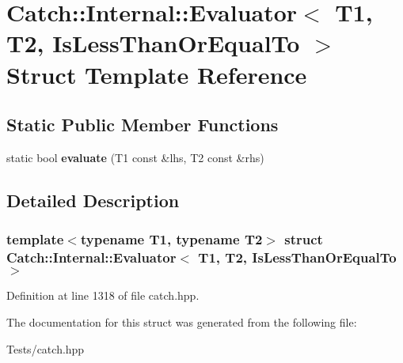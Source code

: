 \hypertarget{struct_catch_1_1_internal_1_1_evaluator_3_01_t1_00_01_t2_00_01_is_less_than_or_equal_to_01_4}{}\section{Catch\+:\+:Internal\+:\+:Evaluator$<$ T1, T2, Is\+Less\+Than\+Or\+Equal\+To $>$ Struct Template Reference}
\label{struct_catch_1_1_internal_1_1_evaluator_3_01_t1_00_01_t2_00_01_is_less_than_or_equal_to_01_4}
\subsection*{Static Public Member Functions}
\begin{DoxyCompactItemize}
\item 
\mbox{\label{struct_catch_1_1_internal_1_1_evaluator_3_01_t1_00_01_t2_00_01_is_less_than_or_equal_to_01_4_adf269a597e4d82d69f29bcb516297b9b}} 
static bool {\bfseries evaluate} (T1 const \&lhs, T2 const \&rhs)
\end{DoxyCompactItemize}


\subsection{Detailed Description}
\subsubsection*{template$<$typename T1, typename T2$>$\newline
struct Catch\+::\+Internal\+::\+Evaluator$<$ T1, T2, Is\+Less\+Than\+Or\+Equal\+To $>$}



Definition at line 1318 of file catch.\+hpp.



The documentation for this struct was generated from the following file\+:\begin{DoxyCompactItemize}
\item 
Tests/catch.\+hpp\end{DoxyCompactItemize}
